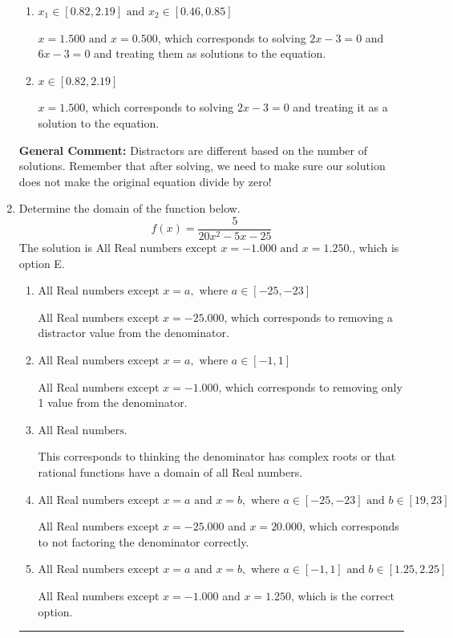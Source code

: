 \documentclass{extbook}[14pt]
\newcommand{\litem}[1]{\item #1

\rule{\textwidth}{0.4pt}}
\begin{document}
\begin{enumerate}
{\begin{enumerate}[label=\Alph*.]
* The equation leads to solving $-37x^{2} +29 x -12=0$, which leads to complex solutions. This is the correct option.
\item \( x_1 \in [0.82, 2.19] \text{ and } x_2 \in [0.46,0.85] \)

$x = 1.500 \text{ and } x = 0.500$, which corresponds to solving $2x -3 = 0$ and $6x -3 = 0$ and treating them as solutions to the equation.
\item \( x \in [0.82,2.19] \)

$x = 1.500$, which corresponds to solving $2x -3 = 0$ and treating it as a solution to the equation.
\end{enumerate}

\textbf{General Comment:} Distractors are different based on the number of solutions. Remember that after solving, we need to make sure our solution does not make the original equation divide by zero!
}
\litem{
Determine the domain of the function below.
\[ f(x) = \frac{5}{20x^{2} -5 x -25} \]The solution is \( \text{All Real numbers except } x = -1.000 \text{ and } x = 1.250. \), which is option E.\begin{enumerate}[label=\Alph*.]
\item \( \text{All Real numbers except } x = a, \text{ where } a \in [-25, -23] \)

All Real numbers except $x = -25.000$, which corresponds to removing a distractor value from the denominator.
\item \( \text{All Real numbers except } x = a, \text{ where } a \in [-1, 1] \)

All Real numbers except $x = -1.000$, which corresponds to removing only 1 value from the denominator.
\item \( \text{All Real numbers.} \)

This corresponds to thinking the denominator has complex roots or that rational functions have a domain of all Real numbers.
\item \( \text{All Real numbers except } x = a \text{ and } x = b, \text{ where } a \in [-25, -23] \text{ and } b \in [19, 23] \)

All Real numbers except $x = -25.000$ and $x = 20.000$, which corresponds to not factoring the denominator correctly.
\item \( \text{All Real numbers except } x = a \text{ and } x = b, \text{ where } a \in [-1, 1] \text{ and } b \in [1.25, 2.25] \)

All Real numbers except $x = -1.000$ and $x = 1.250$, which is the correct option.
\end{enumerate}

}
\end{enumerate}
\end{document}
